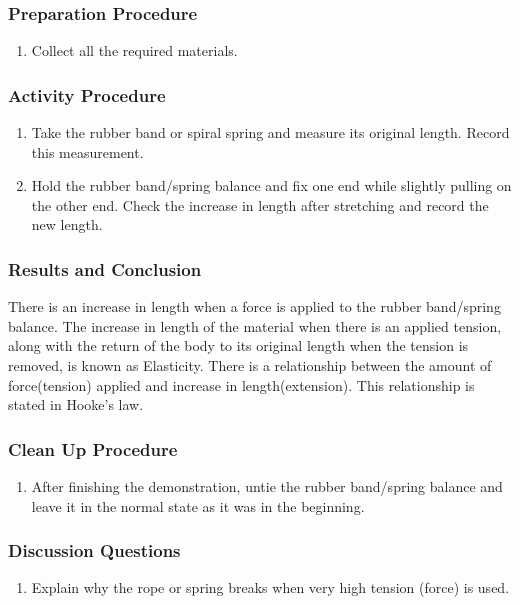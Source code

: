 \subsubsection*{Preparation Procedure}
\begin{enumerate}
\item{Collect all the required materials.}
\end{enumerate}

\subsubsection*{Activity Procedure}
\begin{enumerate}
\item{Take the rubber band or spiral spring and measure its original length. Record this measurement.} 
\item{Hold the rubber band/spring balance and fix one end while slightly pulling on the other end. Check the increase in length after stretching and record the new length.} 
\end{enumerate}

\subsubsection*{Results and Conclusion}
There is an increase in length when a force is applied to the rubber band/spring balance. 
The increase in length of the material when there is an applied tension, along with the return of the body to its original length when the tension is removed, is known as Elasticity. 
There is a relationship between the amount of force(tension) applied and increase in length(extension). This relationship is stated in Hooke's law. 

\subsubsection*{Clean Up Procedure}
\begin{enumerate}
\item{After finishing the demonstration, untie the rubber band/spring balance and leave it in the normal state as it was in the beginning.} 
\end{enumerate}

\subsubsection*{Discussion Questions}
\begin{enumerate}
\item{Explain why the rope or spring breaks when very high tension (force) is used.} 
\end{enumerate}

